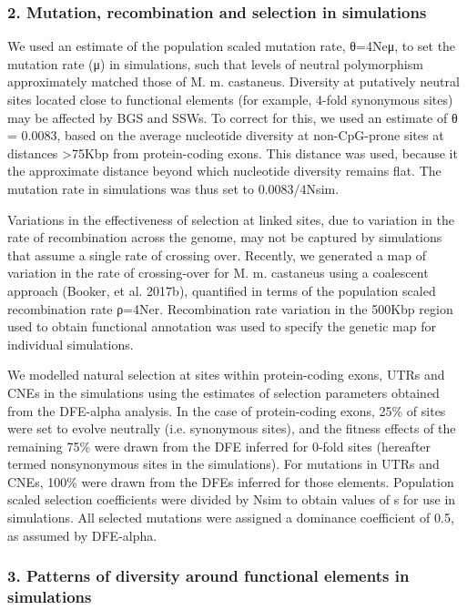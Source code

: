\subsubsection{2. Mutation, recombination and selection in simulations}
 
We used an estimate of the population scaled mutation rate, θ=4Neμ, to set the mutation rate (μ) in simulations, such that levels of neutral polymorphism approximately matched those of M. m. castaneus. Diversity at putatively neutral sites located close to functional elements (for example, 4-fold synonymous sites) may be affected by BGS and SSWs. To correct for this, we used an estimate of θ = 0.0083, based on the average nucleotide diversity at non-CpG-prone sites at distances >75Kbp from protein-coding exons. This distance was used, because it the approximate distance beyond which nucleotide diversity remains flat. The mutation rate in simulations was thus set to 0.0083/4Nsim. 

Variations in the effectiveness of selection at linked sites, due to variation in the rate of recombination across the genome, may not be captured by simulations that assume a single rate of crossing over. Recently, we generated a map of variation in the rate of crossing-over for M. m. castaneus using a coalescent approach (Booker, et al. 2017b), quantified in terms of the population scaled recombination rate ρ=4Ner. Recombination rate variation in the 500Kbp region used to obtain functional annotation was used to specify the genetic map for individual simulations. 

We modelled natural selection at sites within protein-coding exons, UTRs and CNEs in the simulations using the estimates of selection parameters obtained from the DFE-alpha analysis. In the case of protein-coding exons, 25\% of sites were set to evolve neutrally (i.e. synonymous sites), and the fitness effects of the remaining 75\% were drawn from the DFE inferred for 0-fold sites (hereafter termed nonsynonymous sites in the simulations). For mutations in UTRs and CNEs, 100\% were drawn from the DFEs inferred for those elements. Population scaled selection coefficients were divided by Nsim to obtain values of s for use in simulations. All selected mutations were assigned a dominance coefficient of 0.5, as assumed by DFE-alpha.
 
\subsubsection{3. Patterns of diversity around functional elements in simulations}
 
